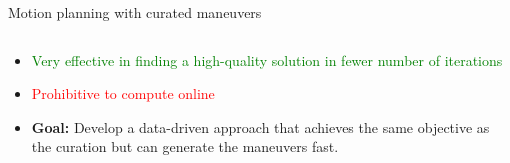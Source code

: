 \begin{columns}[t]
\begin{column}{0.5\textwidth}
\begin{block}{\large Motion planning with curated maneuvers}
\begin{columns}[T]
\begin{column}{0.6\textwidth}
\begin{itemize}
\begin{table}[h!]
						\vspace{0.05in}
					\end{table}
						\item \textcolor{green}{Very effective in finding a high-quality solution in fewer number of iterations}
						\item \textcolor{red}{Prohibitive to compute online}
						\item \textbf{Goal:} Develop a data-driven approach that achieves the same objective as the curation but can generate the maneuvers fast.
					\end{itemize}
				\end{column}
			\end{columns}
		\end{block}
	\end{column}
\end{columns}	
		    
